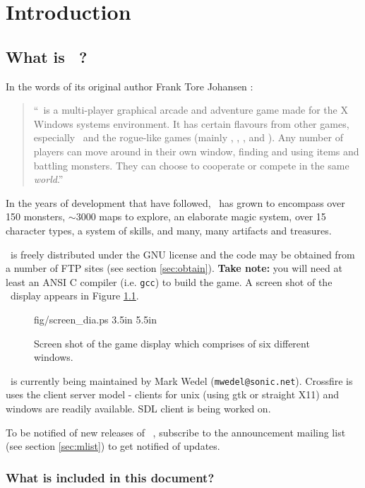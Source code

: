 
\chapter{Introduction}

\section{What is \cf\ ? }
 
In the words of its original author Frank Tore Johansen :
\begin{quote}
``\cf\ is a multi-player graphical arcade and adventure game made for the
X Windows systems environment. It has certain flavours from other games,
especially \gauntlet\ and the rogue-like  games (mainly \hack , \moria ,
\angband , and \ragnarok ). Any number of players can move around in their
own window, finding and using items and battling monsters. They can
choose to cooperate or compete in the same {\em world}.'' 
\end{quote}
In the years of development that have followed, \cf\ has grown to 
encompass over 150 monsters, $\sim$3000 maps to explore, an elaborate
magic system, over 15 character types, a system of skills, and
many, many artifacts and treasures. 

\cf\ is freely distributed under the GNU license and the code may be
obtained from a number of FTP sites (see section \ref{sec:obtain}).
{\bf Take note:} you will need at least an ANSI C compiler (i.e. {\tt gcc}) 
to build the game. A screen shot of the \cf\ display appears in Figure \ref{fig:dis}.

\begin{figure}   
\mongovaryboth fig/screen_dia.ps 3.5in 5.5in
\caption{Screen shot of the game display which comprises of six
different windows. \label{fig:dis}}
\end{figure}

\cf\ is currently being maintained by Mark Wedel ({\tt mwedel@sonic.net}).
Crossfire is uses the client server model - clients for unix (using
gtk or straight X11) and windows are readily available.  SDL client
is being worked on.

To be notified of new releases of \cf\ ,
subscribe to the announcement mailing list
(see section \ref{sec:mlist}) to get notified of updates.

\subsection{What is included in this document?}  

